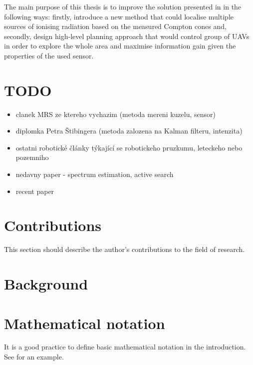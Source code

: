 The main purpose of this thesis is to improve the solution presented in \cite{baca2021gamma} in the following ways: firstly, introduce a new method that could localise multiple sources of ionising radiation based on the measured Compton cones and, 
secondly, 
design high-level planning approach that would control group of \ac{UAV}s in order to explore the whole area and maximise information gain given the properties of the used sensor.




\section{TODO}
\begin{itemize}
  \item clanek MRS ze ktereho vychazim (metoda mereni kuzelu, sensor)
  \item diplomka Petra Štibingera (metoda zalozena na Kalman filteru, intenzita)
  \item ostatni robotické články týkající se robotickeho pruzkumu, leteckeho nebo pozemniho
  \item nedavny paper - spectrum estimation, active search
\item recent paper \cite{Mascarich2022}
\end{itemize}
\section{Contributions}

This section should describe the author's contributions to the field of research.




\section{Background}






\section{Mathematical notation}

It is a good practice to define basic mathematical notation in the introduction.
See  for an example.

